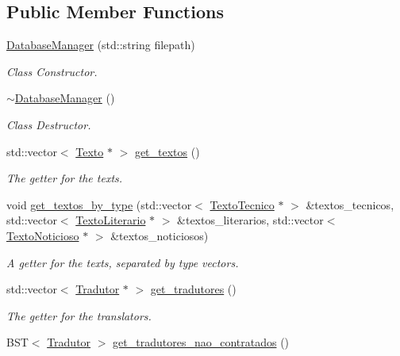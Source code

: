 \subsection*{Public Member Functions}
\begin{DoxyCompactItemize}
\item 
\hyperlink{class_database_manager_a24e3c3701ce01fdac96cc170b334aeba}{Database\-Manager} (std\-::string filepath)
\begin{DoxyCompactList}\small\item\em Class Constructor. \end{DoxyCompactList}\item 
\hyperlink{class_database_manager_ae9b3a5da1e04fbb00faf8a034da1d063}{$\sim$\-Database\-Manager} ()
\begin{DoxyCompactList}\small\item\em Class Destructor. \end{DoxyCompactList}\item 
std\-::vector$<$ \hyperlink{class_texto}{Texto} $\ast$ $>$ \hyperlink{class_database_manager_a362dc9fb3beb6cd0ca9cb1d42703ec03}{get\-\_\-textos} ()
\begin{DoxyCompactList}\small\item\em The getter for the texts. \end{DoxyCompactList}\item 
void \hyperlink{class_database_manager_a3ea3390feb2069715c7af51ebb41a26c}{get\-\_\-textos\-\_\-by\-\_\-type} (std\-::vector$<$ \hyperlink{class_texto_tecnico}{Texto\-Tecnico} $\ast$ $>$ \&textos\-\_\-tecnicos, std\-::vector$<$ \hyperlink{class_texto_literario}{Texto\-Literario} $\ast$ $>$ \&textos\-\_\-literarios, std\-::vector$<$ \hyperlink{class_texto_noticioso}{Texto\-Noticioso} $\ast$ $>$ \&textos\-\_\-noticiosos)
\begin{DoxyCompactList}\small\item\em A getter for the texts, separated by type vectors. \end{DoxyCompactList}\item 
std\-::vector$<$ \hyperlink{class_tradutor}{Tradutor} $\ast$ $>$ \hyperlink{class_database_manager_ad0f509067821ad15a9b25d86d2b515a4}{get\-\_\-tradutores} ()
\begin{DoxyCompactList}\small\item\em The getter for the translators. \end{DoxyCompactList}\item 
B\-S\-T$<$ \hyperlink{class_tradutor}{Tradutor} $>$ \hyperlink{class_database_manager_a86e4c763689ebc8e3c7b6ed3f01728aa}{get\-\_\-tradutores\-\_\-nao\-\_\-contratados} ()

\end{DoxyCompactItemize}
